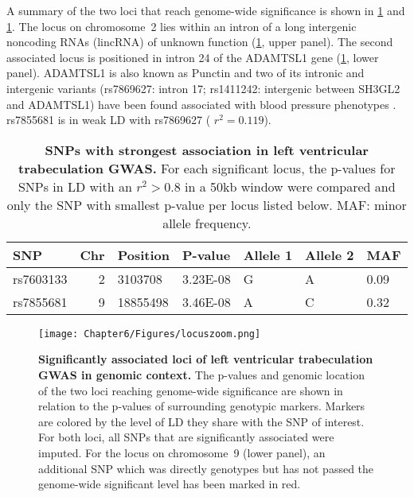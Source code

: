 A summary of the two loci that reach genome-wide significance is shown in \cref{tab:sig-FD} and \cref{fig:locuszoom-fd}. The locus on chromosome~2 lies within an intron of a long intergenic noncoding RNAs (lincRNA) of unknown function (\cref{fig:locuszoom-fd}, upper panel). The second associated locus is positioned in intron \num{24} of the ADAMTSL1 gene (\cref{fig:locuszoom-fd}, lower panel). ADAMTSL1 is also known as Punctin and two of its intronic and intergenic variants  (rs7869627: intron \num{17}; rs1411242: intergenic between SH3GL2 and ADAMTSL1) have been found associated with blood pressure phenotypes \citep{Sabatti2009}. rs7855681 is in weak LD with rs7869627 ( \(r^2=0.119\)). 

\begin{table}[htbp]
  \centering
  \caption[\textbf{SNPs with strongest association in left ventricular trabeculation GWAS. }]{\textbf{SNPs with strongest association in left ventricular trabeculation GWAS. } For each significant locus, the p-values for SNPs in LD with an \(r^2 > 0.8\) in a \num{50}kb window were compared and only the SNP with smallest p-value per locus listed below. MAF: minor allele frequency. }
    \begin{tabular}{lrlllll}
    \toprule
    SNP   & \multicolumn{1}{l}{Chr} & Position & P-value & Allele 1 & Allele 2 & MAF \\
    \midrule
    rs7603133 & 2     & \num{3103708} & \num{3.23E-08} & G     & A     & \num{0.09} \\
    rs7855681 & 9     & \num{18855498} & \num{3.46E-08} & A     & C     & \num{0.32} \\
    \bottomrule
    \end{tabular}%
  \label{tab:sig-FD}%
\end{table}%

\begin{figure}[hbtp]
	\centering
	\texttt{[image: Chapter6/Figures/locuszoom.png]}
	\caption[\textbf{Significantly associated loci of left ventricular trabeculation GWAS in genomic context. }Generated with LocusZoom \citep{Pruim2010}]{\textbf{Significantly associated loci of left ventricular trabeculation GWAS in genomic context. }The p-values and genomic location of the two loci reaching genome-wide significance are shown in relation to the p-values of surrounding genotypic markers. Markers are colored by the level of LD they share with the SNP of interest. For both loci, all SNPs that are significantly associated were imputed. For the locus on chromosome~9 (lower panel), an additional SNP which was directly genotypes but has not passed the genome-wide significant level has been marked in red.}  
	 	\label{fig:locuszoom-fd}
\end{figure}

